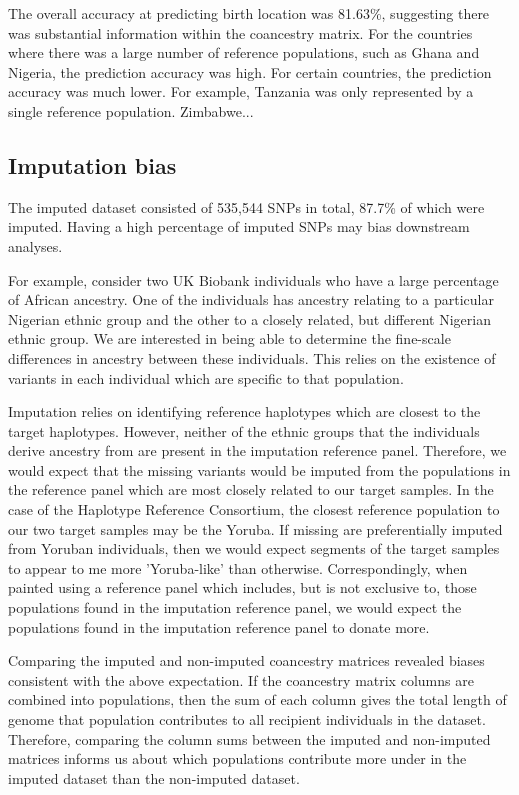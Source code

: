 The overall accuracy at predicting birth location was 81.63\%, suggesting there was substantial information within the coancestry matrix. For the countries where there was a large number of reference populations, such as Ghana and Nigeria, the prediction accuracy was high. For certain countries, the prediction accuracy was much lower. For example, Tanzania was only represented by a single reference population. Zimbabwe...

\subsection{Imputation bias}

The imputed dataset consisted of 535,544 SNPs in total, 87.7\% of which were imputed. Having a high percentage of imputed SNPs may bias downstream analyses. 

For example, consider two UK Biobank individuals who have a large percentage of African ancestry. One of the individuals has ancestry relating to a particular Nigerian ethnic group and the other to a closely related, but different Nigerian ethnic group. We are interested in being able to determine the fine-scale differences in ancestry between these individuals. This relies on the existence of variants in each individual which are specific to that population.

Imputation relies on identifying reference haplotypes which are closest to the target haplotypes. However, neither of the ethnic groups that the individuals derive ancestry from are present in the imputation reference panel. Therefore, we would expect that the missing variants would be imputed from the populations in the reference panel which are most closely related to our target samples. In the case of the Haplotype Reference Consortium, the closest reference population to our two target samples may be the Yoruba. If missing are preferentially imputed from Yoruban individuals, then we would expect segments of the target samples to appear to me more 'Yoruba-like' than otherwise. Correspondingly, when painted using a reference panel which includes, but is not exclusive to, those populations found in the imputation reference panel, we would expect the populations found in the imputation reference panel to donate more.

Comparing the imputed and non-imputed coancestry matrices revealed biases consistent with the above expectation. If the coancestry matrix columns are combined into populations, then the sum of each column gives the total length of genome that population contributes to all recipient individuals in the dataset. Therefore, comparing the column sums between the imputed and non-imputed matrices informs us about which populations contribute more under in the imputed dataset than the non-imputed dataset. 

